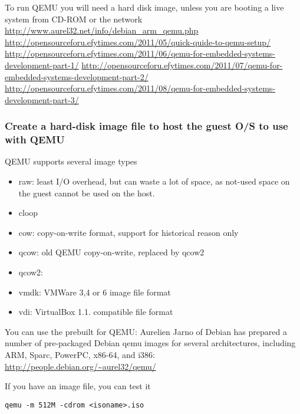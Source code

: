 To run QEMU you will need a hard disk image, unless you are booting a live
system from CD-ROM or the network
\url{http://www.aurel32.net/info/debian_arm_qemu.php}
\url{http://opensourceforu.efytimes.com/2011/05/quick-quide-to-qemu-setup/}
\url{http://opensourceforu.efytimes.com/2011/06/qemu-for-embedded-systems-development-part-1/}
\url{http://opensourceforu.efytimes.com/2011/07/qemu-for-embedded-systems-development-part-2/}
\url{http://opensourceforu.efytimes.com/2011/08/qemu-for-embedded-systems-development-part-3/}


\subsubsection{Create a hard-disk image file to host the guest O/S to
use with QEMU}

  QEMU supports several image types
  \begin{itemize}
    \item raw:  
    least I/O overhead, but can waste a lot of space, as not-used space on the
    guest cannot be used on the host.
    
    
    \item cloop
    
    \item cow: copy-on-write format, support for historical reason only
    
    \item qcow: old QEMU copy-on-write, replaced by qcow2
    
    \item qcow2: 
    
    \item vmdk: VMWare 3,4 or 6 image file format
    
    \item vdi: VirtualBox 1.1. compatible file format
  \end{itemize}


You can use the prebuilt for QEMU:
  Aurelien Jarno of Debian has prepared a number of pre-packaged Debian qemu
  images for several architectures, including ARM, Sparc, PowerPC, x86-64, and
  i386: \url{http://people.debian.org/~aurel32/qemu/}
  

If you have an image file, you can test it
\begin{verbatim}
qemu -m 512M -cdrom <isoname>.iso
\end{verbatim}

